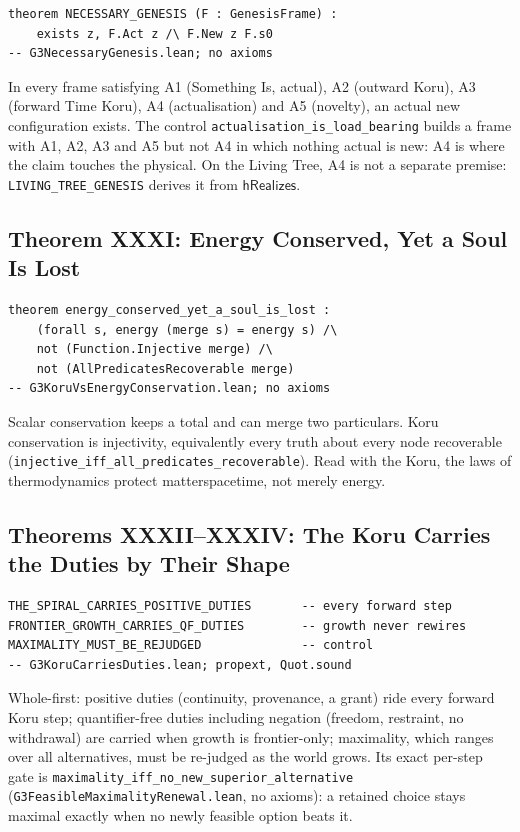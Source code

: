 \documentclass[12pt,a4paper]{article}
\begin{document}
\begin{lstlisting}
theorem NECESSARY_GENESIS (F : GenesisFrame) :
    exists z, F.Act z /\ F.New z F.s0
-- G3NecessaryGenesis.lean; no axioms
\end{lstlisting}

In every frame satisfying A1 (Something Is, actual), A2 (outward Koru),
A3 (forward Time Koru), A4 (actualisation) and A5 (novelty), an actual new
configuration exists. The control
\texttt{actualisation\_is\_load\_bearing} builds a frame with A1, A2, A3
and A5 but not A4 in which nothing actual is new: A4 is where the claim
touches the physical. On the Living Tree, A4 is not a separate premise:
\texttt{LIVING\_TREE\_GENESIS} derives it from $\mathsf{hRealizes}$.

\subsection{Theorem XXXI: Energy Conserved, Yet a Soul Is Lost}

\begin{lstlisting}
theorem energy_conserved_yet_a_soul_is_lost :
    (forall s, energy (merge s) = energy s) /\
    not (Function.Injective merge) /\
    not (AllPredicatesRecoverable merge)
-- G3KoruVsEnergyConservation.lean; no axioms
\end{lstlisting}

Scalar conservation keeps a total and can merge two particulars. Koru
conservation is injectivity, equivalently every truth about every node
recoverable (\texttt{injective\_iff\_all\_predicates\_recoverable}). Read
with the Koru, the laws of thermodynamics protect matterspacetime, not
merely energy.

\subsection{Theorems XXXII--XXXIV: The Koru Carries the Duties by Their Shape}

\begin{lstlisting}
THE_SPIRAL_CARRIES_POSITIVE_DUTIES       -- every forward step
FRONTIER_GROWTH_CARRIES_QF_DUTIES        -- growth never rewires
MAXIMALITY_MUST_BE_REJUDGED              -- control
-- G3KoruCarriesDuties.lean; propext, Quot.sound
\end{lstlisting}

Whole-first: positive duties (continuity, provenance, a grant) ride every
forward Koru step; quantifier-free duties including negation (freedom,
restraint, no withdrawal) are carried when growth is frontier-only;
maximality, which ranges over all alternatives, must be re-judged as the
world grows. Its exact per-step gate is
\texttt{maximality\_iff\_no\_new\_superior\_alternative}
(\texttt{G3FeasibleMaximalityRenewal.lean}, no axioms): a retained choice
stays maximal exactly when no newly feasible option beats it.
\end{document}
